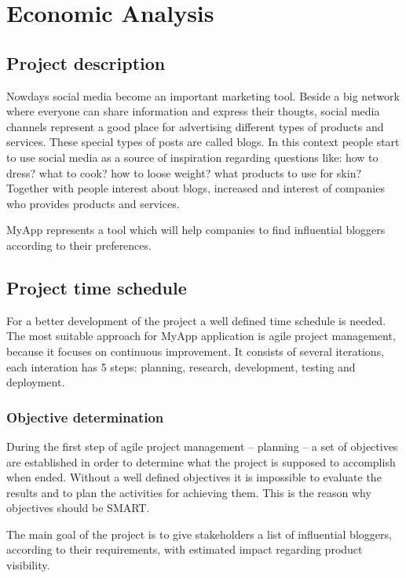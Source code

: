 \section{Economic Analysis}

\subsection{Project description}

Nowdays social media become an important marketing tool. Beside a big network where everyone can share information and express their thougts, social media channels represent a good place for advertising different types of products and services. These special types of posts are called blogs. In this context people start to use social media as a source of inspiration regarding questions like: how to dress? what to cook? how to loose weight? what products to use for skin? Together with people interest about blogs, increased and interest of companies who provides products and services.

MyApp represents a tool which will help companies to find influential bloggers according to their preferences.

\subsection{Project time schedule}

For a better development of the project a well defined time schedule is needed. The most suitable approach for MyApp application is agile project management, because it focuses on continuous improvement. It consists of several iterations, each interation has 5 steps: planning, research, development, testing and deployment.

\subsubsection{Objective determination}

During the first step of agile project management -- planning -- a set of objectives are established in order to determine what the project is supposed to accomplish when ended. Without a well defined objectives it is impossible to evaluate the results and to plan the activities for achieving them. This is the reason why objectives should be SMART. 

The main goal of the project is to give stakeholders a list of influential bloggers, according to their requirements, with estimated impact regarding product visibility.

